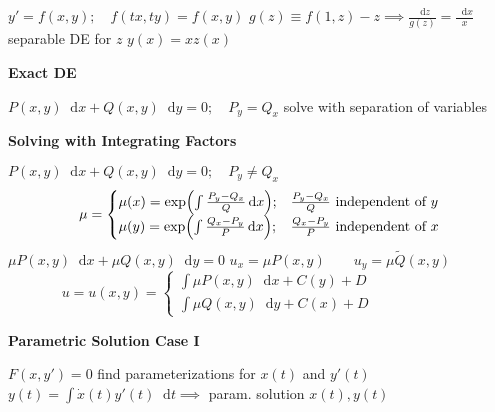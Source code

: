 \documentclass[10pt, a4paper]{article}
\newcommand*\diff{\mathop{}\!\mathrm{d}} %
\begin{document}
\begin{multicols}{2}
$ y' = f(x,y); \quad f(tx, ty) = f(x, y) $ \vspace{1mm} \newline
$ g(z) \equiv f(1, z) - z \implies \frac{\diff z}{g(z)} = \frac{\diff x}{x} $ separable DE for $ z $ \vspace{0.5mm} \newline
$ y(x) = x z(x) $

\vspace{1mm}
\textbf{Exact DE}

$ P(x, y) \diff x + Q(x, y) \diff y = 0; \quad P_y = Q_x $\vspace{0.5mm} \newline
solve with separation of variables

\vspace{1mm}
\textbf{Solving with Integrating Factors}

$ P(x, y) \diff x + Q(x, y) \diff y = 0; \quad P_y \neq Q_x $ \vspace{-2.5mm} \newline
\[
\mu = 
\begin{cases}
	\mu(x) = \exp(\int \frac{P_y - Q_x}{Q} \diff x); & \frac{P_y - Q_x}{Q} \text{ independent of $ y $}\\
	\mu(y) = \exp(\int \frac{Q_x - P_y}{P} \diff x); & \frac{Q_x - P_y}{P} \text{ independent of $ x $}
\end{cases}
\] \vspace{-2.5mm} \newline
$ \mu P(x, y) \diff x + \mu Q(x, y) \diff y = 0 $ \vspace{1mm} \newline
$ u_x = \mu P (x, y) \qquad u_y = \mu \tilde Q(x, y) $\vspace{-2.5mm} \newline
\[
u = u(x, y) = 
\begin{cases}
	\int \mu P(x, y) \diff x + C(y) + D \\
	\int \mu Q(x, y) \diff y + C(x) + D
\end{cases} \qquad \qquad \qquad
\] \vspace{-2.5mm}

\textbf{Parametric Solution Case I}

$ F(x, y') = 0 $ \vspace{0.5mm} \newline
find parameterizations for $ x(t) $ and $ y'(t) $ \vspace{0.5mm} \newline
$ y(t) = \int \dot x(t) y'(t) \diff t \implies $ param. solution $ x(t), y(t) $


\end{multicols}
\end{document}
